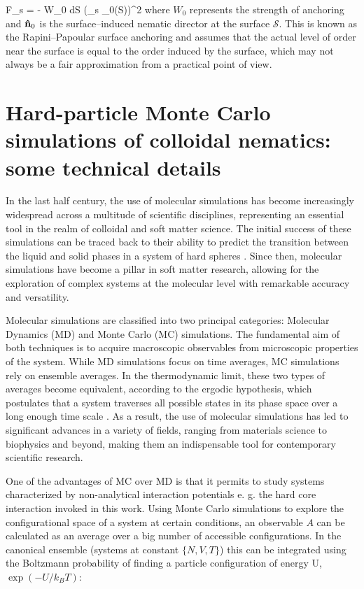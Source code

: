 \beq
F_{s} = - W_{0} \oint d{\mathcal S}  (\bn_{s} \cdot \bn_{0}({\mathcal S}))^{2}
\eeq
where $W_0$ represents the strength of anchoring and ${\bf \hat{n}}_{0}$ is the surface--induced nematic director at the surface $\mathcal S$. This is known as the Rapini--Papoular surface anchoring \cite{rapini1969} and assumes that the actual level of order near the surface is equal to the order induced by the surface, which may not always be a fair approximation from a practical point of view.

\section[HPMC simulations of colloidal nematics]{Hard-particle Monte Carlo simulations of colloidal nematics: some technical details}

In the last half century, the use of molecular simulations has become increasingly widespread across a multitude of scientific disciplines, representing an essential tool in the realm of colloidal and soft matter science. The initial success of these simulations can be traced back to their ability to predict the transition between the liquid and solid phases in a system of hard spheres \cite{ALDER57,WOOD57}. Since then, molecular simulations have become a pillar in soft matter research, allowing for the exploration of complex systems at the molecular level with remarkable accuracy and versatility.

Molecular simulations are classified into two principal categories: Molecular Dynamics (MD) and Monte Carlo (MC) simulations. The fundamental aim of both techniques is to acquire macroscopic observables from microscopic properties of the system. While MD simulations focus on time averages, MC simulations rely on ensemble averages. In the thermodynamic limit, these two types of averages become equivalent, according to the ergodic hypothesis, which postulates that a system traverses all possible states in its phase space over a long enough time scale \cite{dfrenkel96:mc}. As a result, the use of molecular simulations has led to significant advances in a variety of fields, ranging from materials science to biophysics and beyond, making them an indispensable tool for contemporary scientific research.

One of the advantages of MC over MD is that it permits to study systems characterized by non-analytical interaction potentials e. g. the hard core interaction invoked in this work. Using Monte Carlo simulations to explore the configurational space of a system at certain conditions, an observable $A$ can be calculated as an average over a big number of accessible configurations. In the canonical ensemble (systems at constant $\{N,V,T\}$) this can be integrated using the Boltzmann probability of finding a particle configuration of energy U, $\exp( -U/k_{B}T)$:


